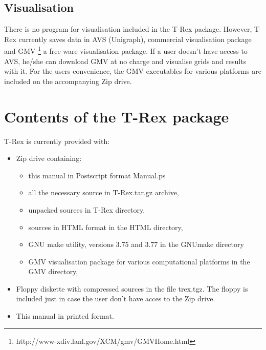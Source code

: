 \documentclass[10pt]{article}
\newcommand*{\tc}{\ttfamily} %
\newcommand*{\tn}{\sffamily} %
\begin{document}
      
    
    \subsection{Visualisation}
    There is no program for visualisation included in the
    {\tn T-Rex} package. However, {\tn T-Rex} currently saves
    data in AVS (Unigraph), commercial visualisation package
    and GMV 
      \footnote{{\tc http://www-xdiv.lanl.gov/XCM/gmv/GMVHome.html}} 
    a free-ware visualisation package. If a user doesn't
    have access to AVS, he/she can download GMV at no charge and
    visualise grids and results with it. For the users convenience,
    the GMV executables for various platforms are included on
    the accompanying Zip drive. 

%
    \newpage
    \section{Contents of the {\tn T-Rex} package}
%

    {\tn T-Rex} is currently provided with:
    \begin{itemize}
      \item Zip drive containing:
        \begin{itemize}
          \item this manual in Postscript format {\tc Manual.ps}
          \item all the necessary source in {\tc T-Rex.tar.gz} archive,
          \item unpacked sources in {\tc T-Rex} directory,
          \item sources in HTML format in the {\tc HTML} directory,
          \item GNU make utility, versions 3.75 and 3.77 in the
                {\tc GNUmake} directory 
          \item GMV visualisation package for various computational
                platforms in the {\tc GMV} directory,
        \end{itemize}
      \item Floppy diskette with compressed sources in the file
            {\tc trex.tgz}. The floppy is included just in case
            the user don't have acces to the Zip drive. 
      \item This manual in printed format.  
    \end{itemize}
\end{document}
